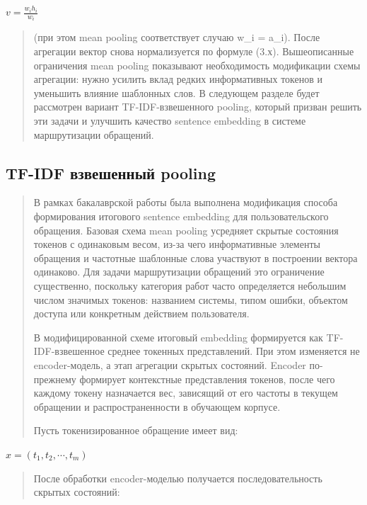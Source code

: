 \documentclass[
]{article}
\begin{document}
\(v = \frac{w_{i}h_{i}}{w_{i}}\)

\begin{quote}
(при этом mean pooling соответствует случаю w\_i = a\_i). После
агрегации вектор снова нормализуется по формуле (3.х). Вышеописанные
ограничения mean pooling показывают необходимость модификации схемы
агрегации: нужно усилить вклад редких информативных токенов и уменьшить
влияние шаблонных слов. В следующем разделе будет рассмотрен вариант
TF-IDF-взвешенного pooling, который призван решить эти задачи и улучшить
качество sentence embedding в системе маршрутизации обращений.
\end{quote}

\hypertarget{tf-idf-ux432ux437ux432ux435ux448ux435ux43dux43dux44bux439-pooling}{%
\subsection{TF-IDF взвешенный
pooling}\label{tf-idf-ux432ux437ux432ux435ux448ux435ux43dux43dux44bux439-pooling}}

\begin{quote}
В рамках бакалаврской работы была выполнена модификация способа
формирования итогового sentence embedding для пользовательского
обращения. Базовая схема mean pooling усредняет скрытые состояния
токенов с одинаковым весом, из-за чего информативные элементы обращения
и частотные шаблонные слова участвуют в построении вектора одинаково.
Для задачи маршрутизации обращений это ограничение существенно,
поскольку категория работ часто определяется небольшим числом значимых
токенов: названием системы, типом ошибки, объектом доступа или
конкретным действием пользователя.

В модифицированной схеме итоговый embedding формируется как
TF-IDF-взвешенное среднее токенных представлений. При этом изменяется не
encoder-модель, а этап агрегации скрытых состояний. Encoder по-прежнему
формирует контекстные представления токенов, после чего каждому токену
назначается вес, зависящий от его частоты в текущем обращении и
распространенности в обучающем корпусе.

Пусть токенизированное обращение имеет вид:
\end{quote}

\(x = \left( t_{1},t_{2},\cdots,t_{m} \right)\)

\begin{quote}
После обработки encoder-моделью получается последовательность скрытых
состояний:
\end{quote}
\end{document}
